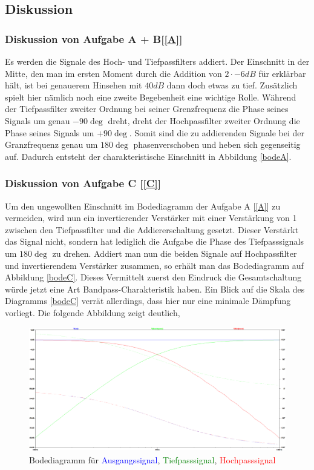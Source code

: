 \subsection{Diskussion}
\subsubsection{Diskussion von Aufgabe A + B[\ref{A}]}
Es werden die Signale des Hoch- und Tiefpassfilters addiert. Der Einschnitt in der Mitte, den man im ersten Moment durch die Addition von $2\cdot \si{-6}{dB}$ für erklärbar hält, ist bei genauerem Hinsehen mit $\si{40}{dB}$ dann doch etwas zu tief. Zusätzlich spielt hier nämlich noch eine zweite Begebenheit eine wichtige Rolle. Während der Tiefpassfilter zweiter Ordnung bei seiner Grenzfrequenz die Phase seines Signals um genau $\si{-90}{\deg}$ dreht, dreht der Hochpassfilter zweiter Ordnung die Phase seines Signals um $\si{+90}{\deg}$. Somit sind die zu addierenden Signale bei der Granzfrequenz genau um $\si{180}{\deg}$ phasenverschoben und heben sich gegenseitig auf. Dadurch entsteht der charakteristische Einschnitt in Abbildung \ref{bodeA}.

\subsubsection{Diskussion von Aufgabe C [\ref{C}]}
Um den ungewollten Einschnitt im Bodediagramm der Aufgabe A [\ref{A}] zu vermeiden, wird nun ein invertierender Verstärker mit einer Verstärkung von 1 zwischen den Tiefpassfilter und die Addiererschaltung gesetzt. Dieser Verstärkt das Signal nicht, sondern hat lediglich die Aufgabe die Phase des Tiefpasssignals um $\si{180}{\deg}$ zu drehen. Addiert man nun die beiden Signale auf Hochpassfilter und invertierendem Verstärker zusammen, so erhält man das Bodediagramm auf Abbildung \ref{bodeC}.
Dieses Vermittelt zuerst den Eindruck die Gesamtschaltung würde jetzt eine Art Bandpass-Charakteristik haben. Ein Blick auf die Skala des Diagramms \ref{bodeC} verrät allerdings, dass hier nur eine minimale Dämpfung vorliegt. Die folgende Abbildung zeigt deutlich,

\begin{figure}[h]
\centering
\includegraphics[width=16cm]{pics/Bode_vergleich}
\caption{Bodediagramm für \textcolor{blue}{Ausgangssignal}, \textcolor{green}{Tiefpasssignal}, \textcolor{red}{Hochpasssignal}}
\label{vergleich}
\end{figure}

